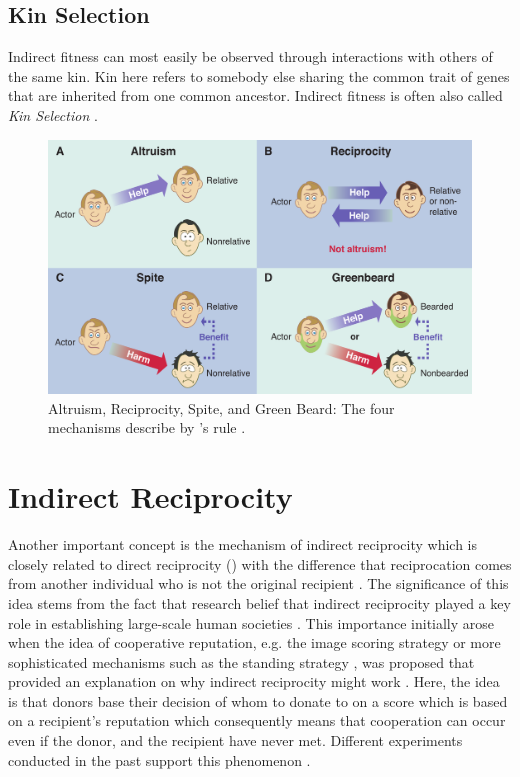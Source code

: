 \documentclass[sigconf]{acmart}
\newcommand{\todo}[1]{{\color{red}{#1}}}
\begin{document}
    \cite{west_altruism_2010}
    \cite{bala_green_2017}
    \cite{nowak_five_2006}

    \todo{would not make this an extra section}

    \subsection{Kin Selection}
    Indirect fitness can most easily be observed through interactions with others of the same kin.
    Kin here refers to somebody else sharing the common trait of genes that are inherited from one common ancestor.
    Indirect fitness is often also called \textit{Kin Selection} \cite{west_altruism_2010}.

    \begin{figure}
        \includegraphics[width=\columnwidth]{figures/mechanisms}
        \caption{Altruism, Reciprocity, Spite, and Green Beard: The four mechanisms describe by \citeauthor{hamilton_kin_1964}'s rule \cite{west_altruism_2010}.}
        \label{fig:mechanisms}
    \end{figure}


    \section{Indirect Reciprocity}
    Another important concept is the mechanism of indirect reciprocity which is closely related to direct reciprocity () with the difference that reciprocation comes from another individual who is not the original recipient \cite{alexander_biology_1987,boyd_evolution_1989}.
    The significance of this idea stems from the fact that research belief that indirect reciprocity played a key role in establishing large-scale human societies \cite{roberts_kin_2019}.
    This importance initially arose when the idea of cooperative reputation, e.g. the image scoring strategy or more sophisticated mechanisms such as the standing strategy \cite{leimar_evolution_2001,ohtsuki_leading_2006}, was proposed that provided an explanation on why indirect reciprocity might work \cite{nowak_evolution_1998}.
    Here, the idea is that donors base their decision of whom to donate to on a score which is based on a recipient's reputation which consequently means that cooperation can occur even if the donor, and the recipient have never met.
    Different experiments conducted in the past support this phenomenon \cite{milinski_cooperation_2002, milinski_reputation_2002,milinski_reputation_2016}.
\end{document}
